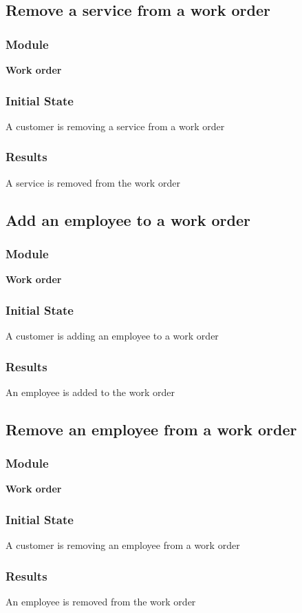 \documentclass[12pt, titlepage]{article}
\begin{document}
\subsection{Remove a service from a work order}
    \subsubsection{Module}
    \textbf{Work order}
    \subsubsection{Initial State}
    A customer is removing a service from a work order
    \subsubsection{Results}
    A service is removed from the work order

\subsection{Add an employee to a work order}
    \subsubsection{Module}
    \textbf{Work order}
    \subsubsection{Initial State}
    A customer is adding an employee to a work order
    \subsubsection{Results}
    An employee is added to the work order

\subsection{Remove an employee from a work order}
    \subsubsection{Module}
    \textbf{Work order}
    \subsubsection{Initial State}
    A customer is removing an employee from a work order
    \subsubsection{Results}
    An employee is removed from the work order
\end{document}
